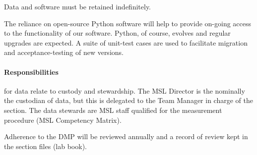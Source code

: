 Data and software must be retained indefinitely. 

The reliance on open-source Python software will help to provide on-going access to the functionality of our software. Python, of course, evolves and regular upgrades are expected. A suite of unit-test cases are used to facilitate migration and acceptance-testing of new versions.

\paragraph{Responsibilities} for data relate to custody and stewardship. The MSL Director is the nominally the custodian of data, but this is delegated to the Team Manager in charge of the section. The data stewards are MSL staff  qualified for the measurement procedure (MSL Competency Matrix). 

Adherence to the DMP will be reviewed annually and a record of review kept in the section files (lab book). 
